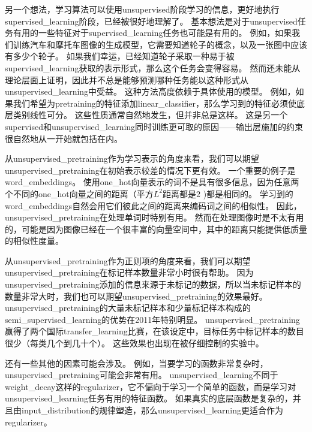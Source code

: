 另一个想法，学习算法可以使用\gls{unsupervised}阶段学习的信息，更好地执行\gls{supervised_learning}阶段，已经被很好地理解了。
基本想法是对于\gls{unsupervised}任务有用的一些特征对于\gls{supervised_learning}任务也可能是有用的。
例如，如果我们训练汽车和摩托车图像的生成模型，它需要知道轮子的概念，以及一张图中应该有多少个轮子。
如果我们幸运，已经知道轮子采取一种易于被\gls{supervised_learning}获取的表示形式，那么这个任务会变得容易。
然而还未能从理论层面上证明，因此并不总是能够预测哪种任务能以这种形式从\gls{unsupervised_learning}中受益。
这种方法高度依赖于具体使用的模型。
例如，如果我们希望为\gls{pretraining}的特征添加\gls{linear_classifier}，那么学习到的特征必须使底层类别线性可分。
这些性质通常自然地发生，但并非总是这样。
这是另一个\gls{supervised}和\gls{unsupervised_learning}同时训练更可取的原因——输出层施加的约束很自然地从一开始就包括在内。


从\gls{unsupervised_pretraining}作为学习表示的角度来看，我们可以期望\gls{unsupervised_pretraining}在初始表示较差的情况下更有效。
一个重要的例子是\gls{word_embeddings}。
使用\gls{one_hot}向量表示的词不是具有很多信息，因为任意两个不同的\gls{one_hot}向量之间的距离（平方$L^2$距离都是$2$ )都是相同的。
学习到的\gls{word_embeddings}自然会用它们彼此之间的距离来编码词之间的相似性。
因此，\gls{unsupervised_pretraining}在处理单词时特别有用。
然而在处理图像时是不太有用的，可能是因为图像已经在一个很丰富的向量空间中，其中的距离只能提供低质量的相似性度量。


从\gls{unsupervised_pretraining}作为正则项的角度来看，我们可以期望\gls{unsupervised_pretraining}在标记样本数量非常小时很有帮助。
因为\gls{unsupervised_pretraining}添加的信息来源于未标记的数据，所以当未标记样本的数量非常大时，我们也可以期望\gls{unsupervised_pretraining}的效果最好。
\gls{unsupervised_pretraining}的大量未标记样本和少量标记样本构成的\gls{semi_supervised_learning}的优势在2011年特别明显。
\gls{unsupervised_pretraining}赢得了两个国际\gls{transfer_learning}比赛\citep{UTLC+LISA-2011-small,goodfellow+all-NIPS2011}，在该设定中，目标任务中标记样本的数目很少（每类几个到几十个）。
这些效果也出现在被\citep{paine2014analysis}仔细控制的实验中。


还有一些其他的因素可能会涉及。
例如，当要学习的函数非常复杂时，\gls{unsupervised_pretraining}可能会非常有用。
\gls{unsupervised_learning}不同于\gls{weight_decay}这样的\gls{regularizer}，它不偏向于学习一个简单的函数，而是学习对\gls{unsupervised_learning}任务有用的特征函数。
如果真实的底层函数是复杂的，并且由\gls{input_distribution}的规律塑造，那么\gls{unsupervised_learning}更适合作为\gls{regularizer}。


